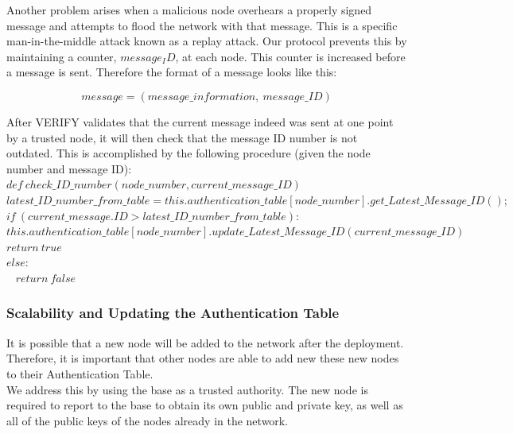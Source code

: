 \documentclass[letterpaper]{article}
\begin{document}
Another problem arises when a malicious node overhears a properly signed message and attempts to flood the network  with that message. This is a specific man-in-the-middle attack known as a replay attack. Our protocol prevents this by maintaining a counter, $message_ID$, at each node. This counter is increased before a message is sent. Therefore the format of a message looks like this:

$$message = (message\_information, \ message\_ID)$$

\noindent After \textsc{VERIFY} validates that the current message indeed was sent at one point by a trusted node, 
it will then check that the message ID number is not outdated. This is accomplished by the following procedure 
(given the node number and message ID):
\\

$def \ check\_ID\_number(node\_number, current\_message\_ID)$ \\
\hspace*{10 mm} $latest\_ID\_number\_from\_table = this.authentication\_table[node\_number].get\_Latest\_Message\_ID();$
\hspace*{10 mm} $if \ (current\_message.ID > latest\_ID\_number\_from\_table):$\\
\hspace*{20 mm} $this.authentication\_table[node\_number].update\_Latest\_Message\_ID(current\_message\_ID)$\\
\hspace*{20 mm} $return \ true$ \\
\hspace*{10 mm} $else:$\\ \ 
\hspace*{20 mm} $return \ false$\\


\subsubsection{Scalability and Updating the Authentication Table}

It is possible that a new node will be added to the network after the deployment. 
Therefore, it is important that other nodes are able to add new these new nodes to their Authentication Table.
\\

\noindent We address this by using the base as a trusted authority. The new node is required to report to the base
to obtain its own public and private key, as well as all of the public keys of the nodes already in the network.
\\
\end{document}
